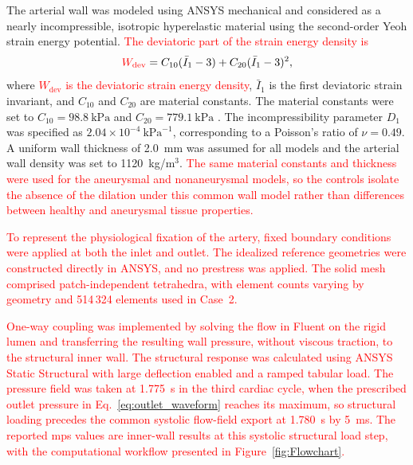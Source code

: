 \documentclass[12pt,a4paper]{article}
\newcommand{\cfdrevision}[1]{\textcolor{red}{#1}}
\newcommand{\MPS}{\ac{mps}\xspace}
\theoremstyle{definition}
\numberwithin{equation}{section}
\newcommand{\revision}[1]{\textcolor{red}{#1}}
\begin{document}
The arterial wall was modeled using ANSYS mechanical and considered as a nearly incompressible, isotropic hyperelastic material using the second-order Yeoh strain energy potential.   \revision{\cfdrevision{The deviatoric part of the strain energy density is}
}\begin{equation}
\textcolor{red}{W_{\mathrm{dev}}} = C_{10}(\bar{I}_1 - 3) + C_{20}(\bar{I}_1 - 3)^2,
\label{eq:yeoh}
\end{equation}
where   \revision{\cfdrevision{\(W_{\mathrm{dev}}\) is the deviatoric strain energy density}}, \(\bar{I}_1\) is the first deviatoric strain invariant, and \(C_{10}\) and \(C_{20}\) are material constants. The material constants were set to \(C_{10} = 98.8~\text{kPa}\) and \(C_{20} = 779.1~\text{kPa}\) \cite{zhu2025combined}. The incompressibility parameter \(D_1\) was specified as \(2.04 \times 10^{-4}~\text{kPa}^{-1}\), corresponding to a Poisson's ratio of \(\nu = 0.49\). A uniform wall thickness of 2.0~mm was assumed for all models and the arterial wall density was set to 1120~kg/m\(^3\).  \revision{\cfdrevision{The same material constants and thickness were used for the aneurysmal and nonaneurysmal models, so the controls isolate the absence of the dilation under this common wall model rather than differences between healthy and aneurysmal tissue properties.}
}

\revision{To represent the physiological fixation of the artery, fixed boundary conditions were applied at both the inlet and outlet. The idealized reference geometries were constructed directly in ANSYS, and no prestress was applied. The solid mesh comprised patch-independent tetrahedra, with element counts varying by geometry and 514\,324 elements used in Case~2.}

\revision{One-way coupling was implemented by solving the flow in Fluent on the rigid lumen and transferring the resulting wall pressure, without viscous traction, to the structural inner wall. The structural response was calculated using ANSYS Static Structural with large deflection enabled and a ramped tabular load. The pressure field was taken at 1.775~s in the third cardiac cycle, when the prescribed outlet pressure in Eq.~\eqref{eq:outlet_waveform} reaches its maximum, so structural loading precedes the common systolic flow-field export at 1.780~s by 5~ms. The reported \MPS values are inner-wall results at this systolic structural load step, with the computational workflow presented in Figure~\ref{fig:Flowchart}.}
\end{document}
